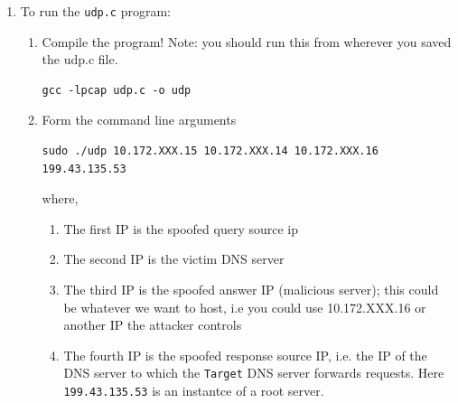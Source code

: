 \begin{enumerate}

\item To run the {\tt udp.c} program: 
\begin{enumerate}
\item Compile the program! Note: you should run this from wherever you saved the udp.c file.
\begin{verbatim}
gcc -lpcap udp.c -o udp
\end{verbatim}
\item Form the command line arguments
\begin{verbatim}
sudo ./udp 10.172.XXX.15 10.172.XXX.14 10.172.XXX.16 199.43.135.53
\end{verbatim}
where, 
\begin{enumerate}
\item The first IP is the spoofed query source ip
\item The second IP is the victim DNS server
\item The third IP is the spoofed answer IP (malicious server); this could be whatever we want to host, i.e you could use 10.172.XXX.16 or another IP the attacker controls
\item The fourth IP is the spoofed response source IP, i.e. the IP of the DNS server  to which the {\tt Target} DNS server forwards requests. Here {\tt 199.43.135.53} is an instantce of a root server.  



\end{enumerate}



\end{enumerate} 
\end{enumerate}

